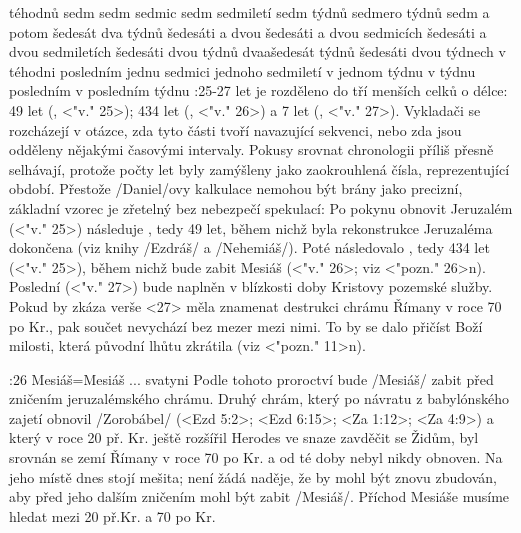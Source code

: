 \vdef %
    {téhodnů sedm}   %
    {sedm sedmic}   %
    {sedm sedmiletí}   %
    {sedm týdnů}   %
    {sedmero týdnů}   %
    {sedm a potom šedesát dva týdnů}   %
\vdef %
    {šedesáti a dvou}   %
    {šedesáti a dvou sedmicích}   %
    {šedesáti a dvou sedmiletích}   %
    {šedesáti dvou týdnů}   %
    {dvaašedesát týdnů}   %
    {šedesáti dvou týdnech}   %
\vdef %
    {v téhodni posledním}   %
    {jednu sedmici}   %
    {jednoho sedmiletí}   %
    {v jednom týdnu}   %
    {v týdnu posledním}   %
    {v posledním týdnu}   %
:25-27 {}  let je rozděleno do tří menších celků o délce: 49 let (, <"v." 25>); 434 let (, <"v." 26>) a 7 let (, <"v." 27>).
Vykladači se rozcházejí v otázce, zda tyto části tvoří navazující sekvenci, nebo zda jsou odděleny nějakými časovými intervaly. Pokusy srovnat chronologii příliš přesně selhávají, protože počty let byly zamýšleny jako zaokrouhlená čísla, reprezentující období. Přestože \x/Daniel/ovy kalkulace nemohou být brány jako precizní, základní vzorec je zřetelný bez nebezpečí spekulací:
Po pokynu obnovit Jeruzalém (<"v." 25>) následuje , tedy 49 let, během nichž byla rekonstrukce Jeruzaléma dokončena (viz knihy \x/Ezdráš/ a \x/Nehemiáš/). Poté následovalo , tedy 434 let (<"v." 25>), během nichž bude zabit Mesiáš (<"v." 26>; viz <"pozn." 26>n).  Poslední  (<"v." 27>) bude naplněn v blízkosti doby Kristovy pozemské služby. Pokud by zkáza verše <27> měla znamenat destrukci chrámu Římany v roce 70 po Kr., pak součet  nevychází bez mezer mezi nimi. To by se dalo přičíst Boží milosti, která původní lhůtu zkrátila (viz <"pozn." 11>n).

:26 {Mesiáš}={Mesiáš ... svatyni} Podle tohoto proroctví bude \x/Mesiáš/ zabit před zničením jeruzalémského chrámu. Druhý chrám, který po návratu z babylónského zajetí obnovil \x/Zorobábel/ 
(<Ezd 5:2>; <Ezd 6:15>; <Za 1:12>; <Za 4:9>) a který v roce 20 př. Kr. ještě rozšířil Herodes ve snaze zavděčit se Židům, byl srovnán se zemí Římany v roce 70 po Kr. a od té doby nebyl nikdy obnoven. Na jeho místě dnes stojí mešita; není žádá naděje, že by mohl být znovu zbudován, aby před jeho dalším zničením mohl být zabit \x/Mesiáš/. Příchod Mesiáše musíme hledat mezi 20 př.Kr. a 70 po Kr.

